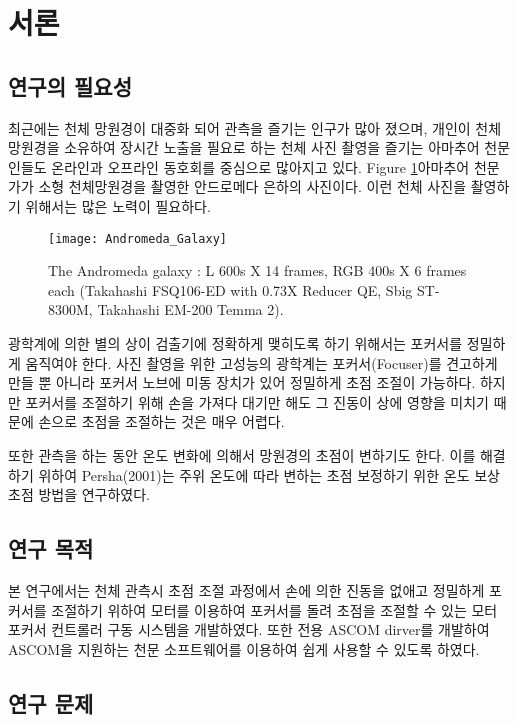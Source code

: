\section{서론}

\subsection{연구의 필요성}

최근에는 천체 망원경이 대중화 되어 관측을 즐기는 인구가 많아 졌으며, 개인이 천체 망원경을 소유하여 장시간 노출을 필요로 하는 천체 사진 촬영을 즐기는 아마추어 천문인들도 온라인과 오프라인 동호회를 중심으로 많아지고 있다. Figure \ref{fig:The_Andromeda_Galaxy}\은 아마추어 천문가가 소형 천체망원경을 촬영한 안드로메다 은하의 사진이다. 이런 천체 사진을 촬영하기 위해서는 많은 노력이 필요하다.

\begin{figure}[h]
	\begin{center}
		\texttt{[image: Andromeda\_Galaxy]}
		\caption{The Andromeda galaxy : L 600s X 14 frames, RGB 400s X 6 frames each (Takahashi FSQ106-ED with 0.73X Reducer QE, Sbig ST-8300M, Takahashi EM-200 Temma 2).}
		\label{fig:The_Andromeda_Galaxy}
	\end{center}
\end{figure}

광학계에 의한 별의 상이 검출기에 정확하게 맺히도록 하기 위해서는 포커서를 정밀하게 움직여야 한다. 사진 촬영을 위한 고성능의 광학계는 포커서(Focuser)를 견고하게 만들 뿐 아니라 포커서 노브에 미동 장치가 있어 정밀하게 초점 조절이 가능하다. 하지만 포커서를 조절하기 위해 손을 가져다 대기만 해도 그 진동이 상에 영향을 미치기 때문에 손으로 초점을 조절하는 것은 매우 어렵다. 

또한 관측을 하는 동안 온도 변화에 의해서 망원경의 초점이 변하기도 한다. 이를 해결하기 위하여 Persha(2001)는 주위 온도에 따라 변하는 초점 보정하기 위한 온도 보상 초점 방법을 연구하였다.


\subsection{연구 목적}

본 연구에서는 천체 관측시 초점 조절 과정에서 손에 의한 진동을 없애고 정밀하게 포커서를 조절하기 위하여 모터를 이용하여 포커서를 돌려 초점을 조절할 수 있는 모터 포커서 컨트롤러 구동 시스템을 개발하였다. 또한 전용 ASCOM dirver를 개발하여 ASCOM을 지원하는 천문 소프트웨어를 이용하여 쉽게 사용할 수 있도록 하였다. 


\subsection{연구 문제}

